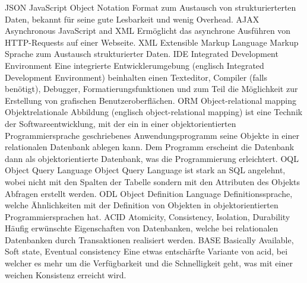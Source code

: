   {JSON}               %
  {JavaScript Object Notation}  %
  {Format zum Austausch von strukturierterten Daten, bekannt für seine gute Lesbarkeit und wenig Overhead.}
  {AJAX}               %
  {Asynchronous JavaScript and XML}  %
  {Ermöglicht das asynchrone Ausführen von HTTP-Requests auf einer Webseite.}
  {XML}               %
  {Extensible Markup Language}  %
  {Markup Sprache zum Austausch strukturierter Daten.}
  {IDE}               %
  {Integrated Development Environment}  %
  {Eine integrierte Entwicklerumgebung (englisch Integrated Development Environment) beinhalten einen Texteditor, 
Compiler (falls benötigt), Debugger, Formatierungsfunktionen und zum Teil die Möglichkeit zur Erstellung von grafischen 
Benutzeroberflächen.}
  {ORM}               %
  {Object-relational mapping}  %
  {Objektrelationale Abbildung (englisch object-relational mapping) ist eine Technik der Softwareentwicklung, mit der ein in einer 
objektorientierten Programmiersprache geschriebenes Anwendungsprogramm seine Objekte in einer relationalen Datenbank ablegen 
kann. Dem Programm erscheint die Datenbank dann als objektorientierte Datenbank, was die Programmierung erleichtert. 
\cite{wiki_orm}}
  {OQL}               %
  {Object Query Language}  %
  {Object Query Language ist stark an SQL angelehnt, wobei nicht mit den Spalten der Tabelle sondern mit den Attributen des Objekts 
Abfragen erstellt werden.}
  {ODL}               %
  {Object Definition Language}  %
  {Definitionssprache, welche Ähnlichkeiten mit der Definition von Objekten in objektorientierten Programmiersprachen hat.}
  {ACID}               %
  {Atomicity, Consistency, Isolation, Durability}  %
  {Häufig erwünschte Eigenschaften von Datenbanken, welche bei relationalen Datenbanken durch Transaktionen realisiert werden.}
  {BASE}               %
  {Basically Available, Soft state, Eventual consistency}  %
  {Eine etwas entschärfte Variante von \gls{acid}, bei welcher es mehr um die Verfügbarkeit und die Schnelligkeit geht, was mit einer 
weichen Konsistenz erreicht wird.}

